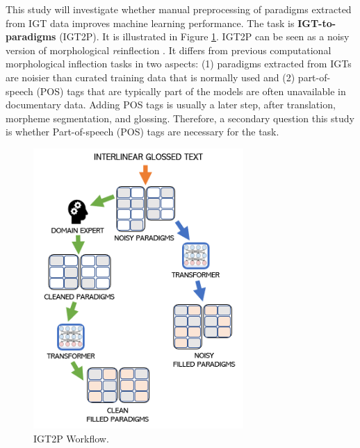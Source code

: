 This study will investigate whether manual preprocessing of paradigms extracted from IGT data improves machine learning performance. The task is \textbf{IGT-to-paradigms} (IGT2P). It is illustrated in Figure \ref{fig:IGT2PWorkflow}. IGT2P can be seen as a noisy version of morphological \textit{re}inflection \cite{cotterell_sigmorphon_2016}. It differs from previous computational morphological inflection tasks \cite{yarowsky-wicentowski-2000-minimally,faruqui-etal-2016-morphological} in two aspects: (1) paradigms extracted from IGTs are noisier than curated training data that is normally used and (2) part-of-speech (POS) tags that are typically part of the models are often unavailable in documentary data. Adding POS tags is usually a later step, after translation, morpheme segmentation, and glossing. Therefore, a secondary question this study is whether Part-of-speech (POS) tags are necessary for the task. 

\begin{figure}[h!]
    \begin{center}
    \includegraphics[width=8cm]{figs/IGT-Paradigm-Workflow.png}
    \caption[IGT2P Workflow]{IGT2P Workflow. 
    }
    \label{fig:IGT2PWorkflow}
    \end{center}
\end{figure}

